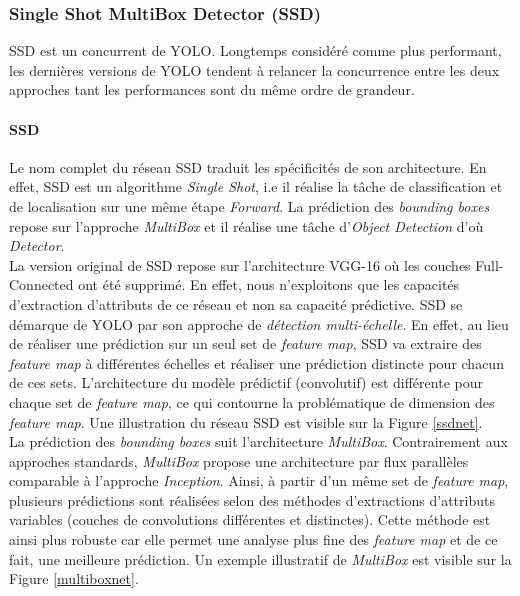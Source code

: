 \subsubsection{Single Shot MultiBox Detector (SSD)}
SSD est un concurrent de YOLO. Longtemps considéré comme plus performant, les dernières versions de YOLO tendent à relancer la concurrence entre les deux approches tant les performances sont du même ordre de grandeur.
\paragraph{SSD}
Le nom complet du réseau SSD\cite{ssd_deep} traduit les spécificités de son architecture. En effet, SSD est un algorithme \textit{Single Shot}, i.e il réalise la tâche de classification et de localisation sur une même étape \textit{Forward}. La prédiction des \textit{bounding boxes} repose sur l'approche \textit{MultiBox}\cite{multibox} et il réalise une tâche d'\textit{Object Detection} d'où \textit{Detector}.\\

\noindent La version original de SSD repose sur l'architecture VGG-16 où les couches Full-Connected ont été supprimé. En effet, nous n'exploitons que les capacités d'extraction d'attributs de ce réseau et non sa capacité prédictive. SSD se démarque de YOLO par son approche de \textit{détection multi-échelle}. En effet, au lieu de réaliser une prédiction sur un seul set de \textit{feature map}, SSD va extraire des \textit{feature map} à différentes échelles et réaliser une prédiction distincte pour chacun de ces sets. L'architecture du modèle prédictif (convolutif) est différente pour chaque set de \textit{feature map}, ce qui contourne la problématique de dimension des \textit{feature map}. Une illustration du réseau SSD est visible sur la Figure \ref{ssdnet}.\\

\noindent La prédiction des \textit{bounding boxes} suit l'architecture \textit{MultiBox}. Contrairement aux approches standards, \textit{MultiBox} propose une architecture par flux parallèles comparable à l'approche \textit{Inception}. Ainsi, à partir d'un même set de \textit{feature map}, plusieurs prédictions sont réalisées selon des méthodes d'extractions d'attributs variables (couches de convolutions différentes et distinctes). Cette méthode est ainsi plus robuste car elle permet une analyse plus fine des \textit{feature map} et de ce fait, une meilleure prédiction. Un exemple illustratif de \textit{MultiBox} est visible sur la Figure \ref{multiboxnet}.\\

